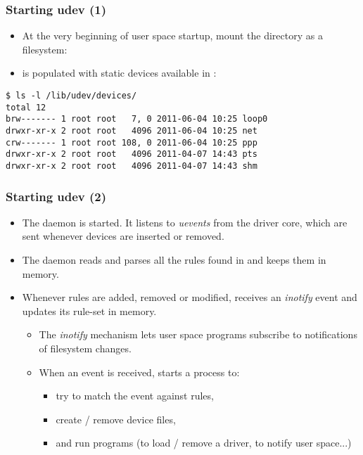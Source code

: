 \begin{frame}[fragile]
  \frametitle{Starting udev (1)}
  \begin{itemize}
  \item At the very beginning of user space startup,
    mount the  directory as a  filesystem:\\
  \item {} is populated with static devices available in
    :
  \end{itemize}
  \begin{block}{}
\begin{verbatim}
$ ls -l /lib/udev/devices/
total 12
brw------- 1 root root   7, 0 2011-06-04 10:25 loop0
drwxr-xr-x 2 root root   4096 2011-06-04 10:25 net
crw------- 1 root root 108, 0 2011-06-04 10:25 ppp
drwxr-xr-x 2 root root   4096 2011-04-07 14:43 pts
drwxr-xr-x 2 root root   4096 2011-04-07 14:43 shm
\end{verbatim}
  \end{block}
\end{frame}

\begin{frame}
  \frametitle{Starting udev (2)}
  \begin{itemize}
  \item The  daemon is started.  It listens to {\em uevents}
    from the driver core, which are sent whenever devices are inserted
    or removed.
  \item The  daemon reads and parses all the rules found
    in  and keeps them in memory.
  \item Whenever rules are added, removed or modified, 
    receives an {\em inotify} event and updates its rule-set in memory.
    \begin{itemize}
    \item The {\em inotify} mechanism lets user space programs
      subscribe to notifications of filesystem changes.
    \item When an event is received,  starts a process to:
      \begin{itemize}
      \item try to match the event against  rules,
      \item create / remove device files,
      \item and run programs (to load / remove a driver, to notify user
        space...)
      \end{itemize}
    \end{itemize}
  \end{itemize}
\end{frame}

